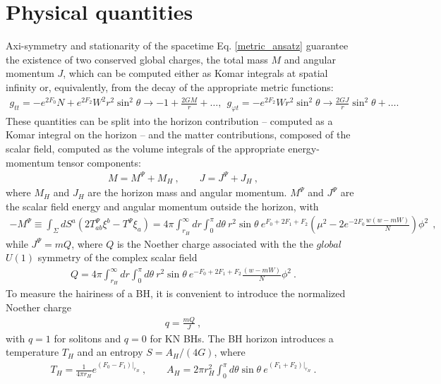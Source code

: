 \section{Physical quantities}
\label{sec_pq}
Axi-symmetry and stationarity of the spacetime Eq. \eqref{metric_ansatz}
 guarantee the existence of two conserved global charges, the total mass $M$ and angular momentum $J$, 
which can be computed either as Komar integrals at spatial infinity or, equivalently, 
from the decay of the appropriate metric functions:
%
\begin{eqnarray}
\label{KNasym}
g_{tt} =-e^{2F_0}N+e^{2F_2}W^2r^2 \sin^2 \theta 
\to
 -1+\frac{2GM}{r}+\dots, ~~
g_{\varphi t}=-e^{2F_2}W r^2 \sin^2 \theta
\to 
\frac{2GJ}{r}\sin^2\theta+\nonumber \dots.  
\end{eqnarray}
%
These quantities can be split into the horizon contribution -- computed as a Komar integral on the horizon -- and the matter contributions, composed of the scalar field, computed as the volume integrals of the appropriate energy-momentum tensor components: 
%
\begin{eqnarray}
\label{MH-hor}
M=M^\Psi+M_H\ , \qquad J=J^\Psi+J_H\ ,
\end{eqnarray}
where $M_H$ and $J_H$  are the horizon mass and angular momentum.
$M^\Psi$ and $J^\Psi$ are the scalar field energy and angular momentum outside the horizon,
with  
\begin{align}
\label{Mpsi}
-M^\Psi\equiv  \int_{\Sigma} dS^a (2T_{ab}^\Psi \xi^b-T^\Psi\xi_a)
 = 4\pi \int_{r_H}^\infty dr \int_0^\pi d\theta~r^2\sin \theta ~e^{F_0+2F_1+F_2}
 \left(
 \mu^2-2 e^{-2F_0}\frac{w(w-mW)}{N}
 \right)\phi^2 ~~,
\end{align}
while $J^\Psi=mQ$,
where $Q$ is the Noether charge 
associated with the the $global$ $U(1)$ symmetry of the complex scalar field 
\begin{eqnarray}
\label{Q-int}
Q=4\pi \int_{r_H}^\infty dr \int_0^\pi d\theta 
~r^2\sin \theta ~e^{-F_0+2F_1+F_2}  \frac{(w-mW)}{N}\phi^2 ~.
\end{eqnarray}
To measure the hairiness of a BH, it is convenient 
to introduce the normalized Noether charge
\begin{eqnarray}
\label{KNq}
q=\frac{mQ}{J}~,
\end{eqnarray}
with $q=1$ for solitons and $q=0$ for KN BHs.
The BH horizon introduces a temperature $T_H$ and an entropy $S={A_H}/({4G})$,
where 
%
\begin{eqnarray}
\label{KNTHAH}
T_H=\frac{1}{4\pi r_H}e^{(F_0-F_1)|_{r_H}}\ ,
\qquad
A_H=2\pi r_H^2 \int_0^\pi d\theta \sin \theta~e^{(F_1+F_2)|_{r_H}} \ .
\end{eqnarray}

